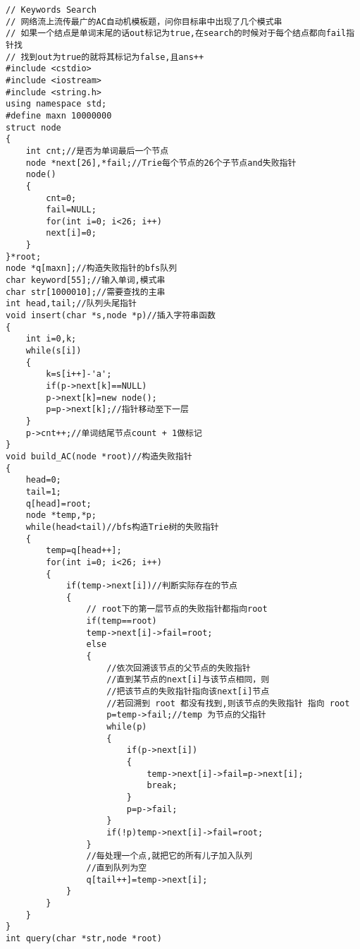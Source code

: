 \documentclass{CustGraduPaper}
\begin{document}
\begin{lstlisting}
// Keywords Search
// 网络流上流传最广的AC自动机模板题，问你目标串中出现了几个模式串
// 如果一个结点是单词末尾的话out标记为true,在search的时候对于每个结点都向fail指针找
// 找到out为true的就将其标记为false,且ans++
#include <cstdio>
#include <iostream>
#include <string.h>
using namespace std;
#define maxn 10000000
struct node
{
	int cnt;//是否为单词最后一个节点
	node *next[26],*fail;//Trie每个节点的26个子节点and失败指针
	node()
	{
		cnt=0;
		fail=NULL;
		for(int i=0; i<26; i++)
		next[i]=0;
	}
}*root;
node *q[maxn];//构造失败指针的bfs队列
char keyword[55];//输入单词,模式串
char str[1000010];//需要查找的主串
int head,tail;//队列头尾指针
void insert(char *s,node *p)//插入字符串函数
{
	int i=0,k;
	while(s[i])
	{
		k=s[i++]-'a';
		if(p->next[k]==NULL)
		p->next[k]=new node();
		p=p->next[k];//指针移动至下一层
	}
	p->cnt++;//单词结尾节点count + 1做标记
}
void build_AC(node *root)//构造失败指针
{
	head=0;
	tail=1;
	q[head]=root;
	node *temp,*p;
	while(head<tail)//bfs构造Trie树的失败指针
	{
		temp=q[head++];
		for(int i=0; i<26; i++)
		{
			if(temp->next[i])//判断实际存在的节点
			{
				// root下的第一层节点的失败指针都指向root
				if(temp==root)
				temp->next[i]->fail=root;
				else
				{
					//依次回溯该节点的父节点的失败指针
					//直到某节点的next[i]与该节点相同，则
					//把该节点的失败指针指向该next[i]节点
					//若回溯到 root 都没有找到,则该节点的失败指针 指向 root
					p=temp->fail;//temp 为节点的父指针
					while(p)
					{
						if(p->next[i])
						{
							temp->next[i]->fail=p->next[i];
							break;
						}
						p=p->fail;
					}
					if(!p)temp->next[i]->fail=root;
				}
				//每处理一个点,就把它的所有儿子加入队列
				//直到队列为空
				q[tail++]=temp->next[i];
			}
		}
	}
}
int query(char *str,node *root)

\end{lstlisting}
\end{document}
